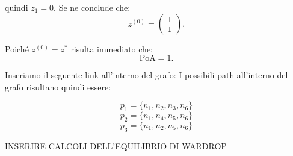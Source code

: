 \begin{alphaparts}
    quindi \(z_1 = 0.\) Se ne conclude che:
    \[ z^{(0)} = \begin{pmatrix}
        1 \\ 1
    \end{pmatrix}.\]

    Poiché \(z^{(0)} = z^*\) risulta immediato che:
    \[\text{PoA} = 1.\]

    \questionpart
   Inseriamo il seguente link all'interno del grafo:
    I possibili path all'interno del grafo risultano quindi essere:

    \[p_1 = \{n_1, n_2, n_3, n_6\}\]
    \[p_2 = \{n_1, n_4, n_5, n_6\}\]
    \[p_3 = \{n_1, n_2, n_5, n_6\}\]

    INSERIRE CALCOLI DELL'EQUILIBRIO DI WARDROP

    

\end{alphaparts}